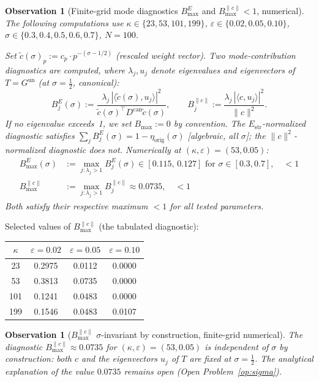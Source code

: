 \documentclass[11pt]{article}
\newtheorem{observation}[theorem]{Observation}
\newcommand{\etaorig}{\eta_{\mathrm{orig}}}
\newcommand{\Gun}{G^{\mathrm{un}}}
\begin{document}
\begin{observation}[Finite-grid mode diagnostics $B^E_{\max}$ and $B^{\|c\|}_{\max}<1$, numerical]
\label{obs:bmax}
The following computations use
$\kappa\in\{23,53,101,199\}$, $\varepsilon\in\{0.02,0.05,0.10\}$,
$\sigma\in\{0.3,0.4,0.5,0.6,0.7\}$, $N=100$.

Set $\tilde{c}(\sigma)_p:=c_p\cdot p^{-(\sigma-1/2)}$ (rescaled weight vector).
Two mode-contribution diagnostics are computed, where $\lambda_j,u_j$
denote eigenvalues and eigenvectors of $T=\Gun$ (at $\sigma=\tfrac12$,
canonical):
\[
B^E_j(\sigma):=\frac{\lambda_j\,|\langle\tilde{c}(\sigma),u_j\rangle|^2}
               {\tilde{c}(\sigma)^\top D^{\mathrm{can}}\tilde{c}(\sigma)},
\qquad
B^{\|c\|}_j:=\frac{\lambda_j\,|\langle c,u_j\rangle|^2}{\|c\|^2}.
\]
If no eigenvalue exceeds~1, we set $B_{\max}:=0$ by convention.
The $E_{\mathrm{str}}$-normalized diagnostic satisfies
$\sum_j B^E_j(\sigma)=1-\etaorig(\sigma)$ [algebraic, all $\sigma$];
the $\|c\|^2$-normalized diagnostic does not.
Numerically at $(\kappa,\varepsilon)=(53,0.05)$:
\begin{align*}
B^E_{\max}(\sigma) &:= \max_{j:\lambda_j>1} B^E_j(\sigma)
\in[0.115,\,0.127]\text{ for }\sigma\in[0.3,0.7],\quad <1 \\
B^{\|c\|}_{\max} &:= \max_{j:\lambda_j>1} B^{\|c\|}_j
\approx 0.0735,\quad<1
\end{align*}
Both satisfy their respective maximum $<1$ for all tested parameters.
\end{observation}

Selected values of $B^{\|c\|}_{\max}$ (the tabulated diagnostic):

\begin{center}
\begin{tabular}{cccc}
\toprule
$\kappa$ & $\varepsilon=0.02$ & $\varepsilon=0.05$ & $\varepsilon=0.10$ \\
\midrule
23  & 0.2975 & 0.0112 & 0.0000 \\
53  & 0.3813 & 0.0735 & 0.0000 \\
101 & 0.1241 & 0.0483 & 0.0000 \\
199 & 0.1546 & 0.0483 & 0.0107 \\
\bottomrule
\end{tabular}
\end{center}

\begin{observation}[$B^{\|c\|}_{\max}$ $\sigma$-invariant by construction, finite-grid numerical]
The diagnostic $B^{\|c\|}_{\max}\approx0.0735$ for $(\kappa,\varepsilon)=(53,0.05)$
is independent of $\sigma$ by construction: both $c$ and the eigenvectors $u_j$
of $T$ are fixed at $\sigma=\tfrac12$. The analytical explanation of the
value $0.0735$ remains open (Open Problem~\ref{op:sigma}).
\end{observation}
\end{document}
